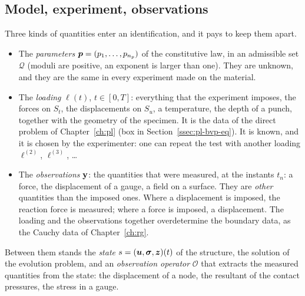 \subsection{Model, experiment, observations}\label{ssec:id-def}
%
Three kinds of quantities enter an identification, and it pays to keep them
apart.
\begin{itemize}
  \item The \emph{parameters} $\bm{p}=(p_1,\dots,p_{n_p})$ of the constitutive law, in
  an admissible set $\mathcal Q$ (moduli are positive, an exponent is larger than
  one). They are unknown, and they are the same in every experiment made on the
  material.
  \item The \emph{loading} $\ell(t)$, $t\in[0,T]$: everything that the experiment
  imposes, the forces on $S_t$, the displacements on $S_u$, a temperature, the depth
  of a punch, together with the geometry of the specimen. It is the data of the
  direct problem of Chapter~\ref{ch:pl} (box in Section~\ref{ssec:pl-bvp-eq}). It is
  known, and it is chosen by the experimenter: one can repeat the test with
  another loading $\ell^{(2)}$, $\ell^{(3)}$, \dots
  \item The \emph{observations} $\mathbf{y}$: the quantities that were measured, at the
  instants $t_n$: a force, the displacement of a gauge, a field on a surface. They
  are \emph{other} quantities than the imposed ones. Where a displacement is
  imposed, the reaction force is measured; where a force is imposed, a
  displacement. The loading and the observations together overdetermine the
  boundary data, as the Cauchy data of Chapter~\ref{ch:rg}.
\end{itemize}
Between them stands the \emph{state} $s=(\bm{u},\bm{\sigma},\bm{z})(t)$ of the structure, the
solution of the evolution problem, and an \emph{observation operator}
$\mathcal O$ that extracts the measured quantities from the state: the
displacement of a node, the resultant of the contact pressures, the stress in a
gauge.

